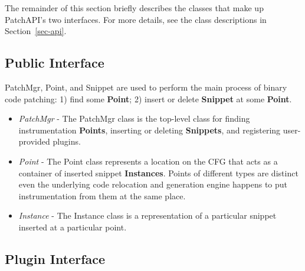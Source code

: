 The remainder of this section briefly describes the classes that make up
PatchAPI's two interfaces. For more details, see the class descriptions in
Section~\ref{sec-api}.

\subsection{Public Interface}
\label{sec-2.1}

PatchMgr, Point, and Snippet are used to perform the main process of binary code
patching: 1) find some \textbf{Point}; 2) insert or delete \textbf{Snippet} at some \textbf{Point}.
\begin{itemize}
\item \emph{PatchMgr} - The PatchMgr class is the top-level class for finding
    instrumentation \textbf{Points}, inserting or deleting \textbf{Snippets}, and registering
    user-provided plugins.
\item \emph{Point} - The Point class represents a location on the CFG that acts as a
    container of inserted snippet \textbf{Instances}. Points of different types are
    distinct even the underlying code relocation and generation engine happens
    to put instrumentation from them at the same place.
\item \emph{Instance} - The Instance class is a representation of a particular snippet
    inserted at a particular point.
\end{itemize}
\subsection{Plugin Interface}
\label{sec-2.2}

